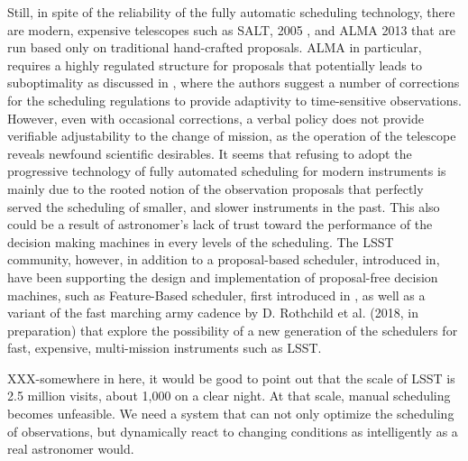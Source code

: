 \documentclass[12pt]{aastex62}
\theoremstyle{definition}
\begin{document}
Still, in spite of the reliability of the fully automatic scheduling technology, there are modern, expensive telescopes such as SALT, 2005 \citep{brink2008salt}, and ALMA 2013 \citep{wootten2003atacama} that are run based only on traditional hand-crafted proposals. ALMA in particular, requires a highly regulated structure for proposals that potentially leads to suboptimality as discussed in \citep{alexander2017enabling}, where the authors suggest a number of corrections for the scheduling regulations to provide adaptivity to time-sensitive observations. However, even with occasional corrections, a verbal policy does not provide verifiable adjustability to the change of mission, as the operation of the telescope reveals newfound scientific desirables. It seems that refusing to adopt the progressive technology of fully automated scheduling for modern instruments is mainly due to the rooted notion of the observation proposals that perfectly served the scheduling of smaller, and slower instruments in the past. This also could be a result of astronomer's lack of trust toward the performance of the decision making machines in every levels of the scheduling. The LSST community, however, in addition to a proposal-based scheduler, introduced in\citep{delgado2016lsst}, have been supporting the design and implementation of proposal-free decision machines, such as Feature-Based scheduler, first introduced in \citep{naghib2016feature}, as well as a variant of the fast marching army cadence by D. Rothchild et al. (2018, in preparation) that explore the possibility of a new generation of the schedulers for fast, expensive, multi-mission instruments such as LSST.

XXX-somewhere in here, it would be good to point out that the scale of LSST is 2.5 million visits, about 1,000 on a clear night. At that scale, manual scheduling becomes unfeasible. We need a system that can not only optimize the scheduling of observations, but dynamically react to changing conditions as intelligently as a real astronomer would. 
\end{document}
